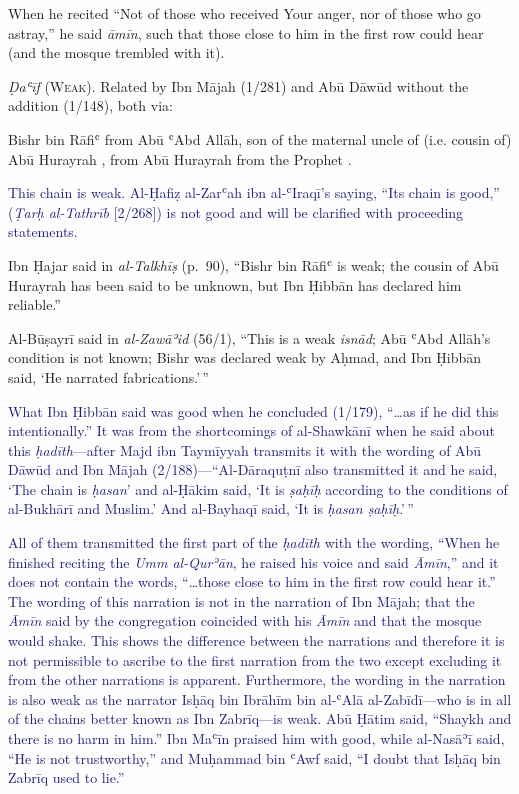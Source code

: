 \begin{mdframed}[style=narration, frametitle={Narration \#952}]
When he recited “Not of those who received Your anger, nor of those who go astray,” he said \textit{āmīn}, such that those close to him in the first row could hear (and the mosque trembled with it).
\end{mdframed}

\emph{Ḍaʿīf} (\textsc{Weak}). Related by Ibn Mājah (1/281) and Abū Dāwūd
without the addition (1/148), both via:

Bishr bin Rāfiʿ from Abū ʿAbd Allāh, son of the maternal uncle of (i.e. cousin of) Abū Hurayrah \mabpwhim,
from Abū Hurayrah \mabpwhim from the Prophet \pbuh.

\textcolor{MidnightBlue}{This chain is weak. Al-Ḥafiẓ
al-Zarʿah ibn al-ʿIraqī's saying, “Its chain is good,” (\textit{Ṭarḥ al-Tathrīb} [2/268]) is not good and will be clarified with proceeding statements.}

Ibn Ḥajar said in \emph{al-Talkhīṣ} (p.~90), ``Bishr bin Rāfiʿ is weak;
the cousin of Abū Hurayrah \mabpwhim has been said to be unknown, but
Ibn Ḥibbān has declared him reliable.''

Al-Būṣayrī said in \emph{al-Zawāʾid} (56/1), ``This is a weak
\emph{isnād}; Abū ʿAbd Allāh's condition is not known; Bishr was
declared weak by Aḥmad, and Ibn Ḥibbān said, `He narrated
fabrications.'\,''

\textcolor{MidnightBlue}{What Ibn Ḥibbān said was good when he concluded (1/179), ``\ldots{}as if
  he did this intentionally.'' It was from the shortcomings of al-Shawkānī
  when he said about this \emph{ḥadīth}---after Majd ibn Taymīyyah
  transmits it with the wording of Abū Dāwūd and Ibn Mājah
  (2/188)---``Al-Dāraquṭnī also transmitted it and he said, `The chain is
  \emph{ḥasan}' and al-Ḥākim said, `It is \emph{ṣaḥīḥ} according to the
  conditions of al-Bukhārī and Muslim.' And al-Bayhaqī said, `It is
  \emph{ḥasan ṣaḥīḥ}.'\,''}
  
\textcolor{MidnightBlue}{All of them transmitted the first part of the
\emph{ḥadīth} with the wording, ``When he finished reciting the \emph{Umm al-Qurʾān},
he raised his voice and said \emph{Āmīn},'' and it does not contain the words,
``\ldots{}those close to him in the first row could hear it.'' The
wording of this narration is not in the narration of Ibn Mājah; that the
\emph{Āmīn} said by the congregation coincided with his
\pbuh \emph{Āmīn} and that the mosque would shake. This shows the
difference between the narrations and therefore it is not permissible to
ascribe to the first narration from the two except excluding it from the
other narrations is apparent. Furthermore, the wording in the narration
is also weak as the narrator Isḥāq bin Ibrāhīm bin al-ʿAlā
al-Zabīdī---who is in all of the chains better known as Ibn Zabrīq---is
weak. Abū Ḥātim said, ``Shaykh and there is no harm in him.'' Ibn Maʿīn
praised him with good, while al-Nasāʾī said, ``He is not trustworthy,''
and Muḥammad bin ʿAwf said, ``I doubt that Isḥāq bin Zabrīq used to
lie.''}

